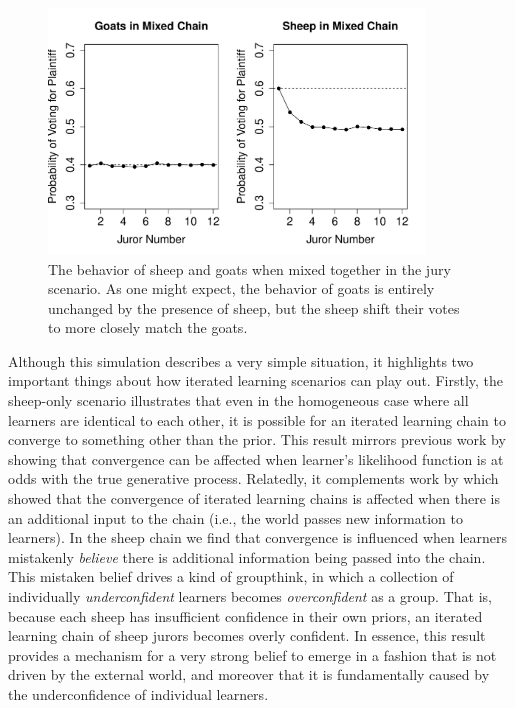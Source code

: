 \documentclass[doc]{apa6}
\begin{document}
\begin{figure}[t]
\begin{center}
\includegraphics[width=10cm]{juror2.pdf} %
\caption{{\small The behavior of {\sc sheep} and {\sc goats} when mixed together in the jury scenario. As one might expect, the behavior of {\sc goats} is entirely unchanged by the presence of {\sc sheep}, but the {\sc sheep} shift their votes to more closely match the {\sc goats}.}}
\label{juror2}
\end{center}
\end{figure}

Although this simulation describes a very simple situation, it highlights two important things about how iterated learning scenarios can play out. Firstly, the {\sc sheep}-only scenario illustrates that even in the homogeneous case where all learners are identical to each other, it is possible for an iterated learning chain to converge to something other than the prior. This result mirrors previous work by \textcite{smith2009iterated} showing that convergence can be affected when learner's likelihood function is at odds with the true generative process. Relatedly, it complements work by \textcite{perforsnavarro14} which showed that the convergence of iterated learning chains is affected when there is an additional input to the chain (i.e., the world passes new information to learners). In the {\sc sheep} chain we find that convergence is influenced when learners mistakenly {\it believe} there is additional information being passed into the chain. This mistaken belief drives a kind of groupthink, in which a collection of individually {\it underconfident} learners becomes {\it overconfident} as a group. That is, because each {\sc sheep} has insufficient confidence in their own priors, an iterated learning chain of {\sc sheep} jurors becomes overly confident. In essence, this result provides a mechanism for a very strong belief to emerge in a fashion that is not driven by the external world, and moreover that it is fundamentally caused by the underconfidence of individual learners.
\end{document}
